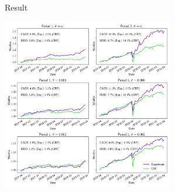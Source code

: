 \begin{frame}{Result}
\begin{center}
\includegraphics[height= 7.5cm]{images/crp_compare.png}
\end{center}

\end{frame}